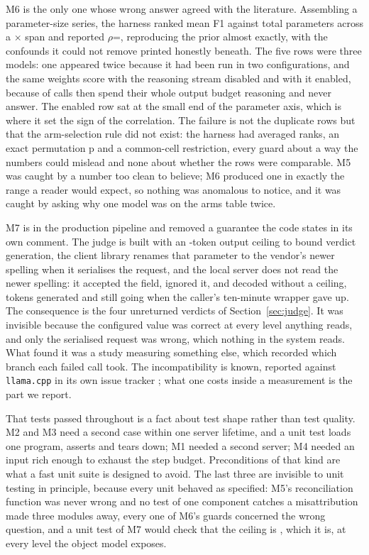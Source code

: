 M6 is the only one whose wrong answer agreed with the literature. Assembling a parameter-size
series, the harness ranked mean F1 against total parameters across a $\times$
span and reported $\rho$=, reproducing the prior almost exactly, with the
confounds it could not remove printed honestly beneath. The five rows were three models: one
appeared twice because it had been run in two configurations, and the same weights score
 with the reasoning stream disabled and 
with it enabled, because  of  calls then spend
their whole output budget reasoning and never answer. The enabled row sat at the small end of the
parameter axis, which is where it set the sign of the correlation. The failure is not the duplicate
rows but that the arm-selection rule did not exist: the harness had averaged ranks, an exact
permutation p and a common-cell restriction, every guard about a way the numbers could mislead and
none about whether the rows were comparable. M5 was caught by a number too clean to believe; M6
produced one in exactly the range a reader would expect, so nothing was anomalous to notice, and it
was caught by asking why one model was on the arms table twice.

M7 is in the production pipeline and removed a guarantee the code states in its own comment. The
judge is built with an -token output ceiling to bound verdict generation, the
client library renames that parameter to the vendor's newer spelling when it serialises the request,
and the local server does not read the newer spelling: it accepted the field, ignored it, and
decoded without a ceiling,  tokens generated and still going when the
caller's ten-minute wrapper gave up. The consequence is the four unreturned verdicts of
Section~\ref{sec:judge}. It was invisible because the configured value was correct at every level
anything reads, and only the serialised request was wrong, which nothing in the system reads. What
found it was a study measuring something else, which recorded which branch each failed call took.
The incompatibility is known, reported against \texttt{llama.cpp} in its own issue tracker
; what one costs inside a measurement is the part we report.

That  tests passed throughout is a fact about test shape rather than test quality.
M2 and M3 need a second case within one server lifetime, and a unit test loads one program, asserts
and tears down; M1 needed a second server; M4 needed an input rich enough to exhaust the step
budget. Preconditions of that kind are what a fast unit suite is designed to avoid. The last three
are invisible to unit testing in principle, because every unit behaved as specified: M5's
reconciliation function was never wrong and no test of one component catches a misattribution made
three modules away, every one of M6's guards concerned the wrong question, and a unit test of M7
would check that the ceiling is , which it is, at every level the object
model exposes.

